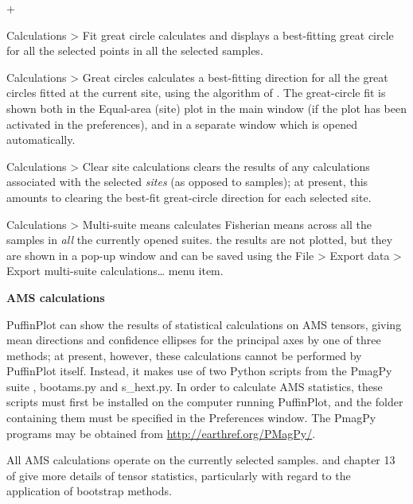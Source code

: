 \documentclass[a4paper,british]{article}
\newcommand{\menuitemlabel}[1]{%
\mbox{\textsf{#1}}\hfil}
\newenvironment{menuitemlist}%
{\begin{list}{}{%
\renewcommand{\makelabel}{\menuitemlabel}%
\setlength{\labelwidth}{35pt}%
\setlength{\leftmargin}%
             {\labelwidth+\labelsep}}}%
{\end{list}}
\newcommand{\ppcmd}[1]{\textsf{#1}} %
\newcommand{\caps}[1]{\MakeTextUppercase{#1}} %
\newcommand{\submenu}{ \textgreater{} } %
\newcommand{\mypara}[1]{\noindent\textbf{#1}

\noindent\ignorespaces} %
\begin{document}
\begin{menuitemlist}
\item[Calculations\submenu Fit great circle] calculates and displays a
  best-fitting great circle for all the selected points in all the selected
  samples.

\item[Calculations\submenu Great circles] calculates a best-fitting direction
  for all the great circles fitted at the current site, using the algorithm
  of \cite{mcfadden1988circles}. The great-circle fit is shown both in the
  \ppcmd{Equal-area (site)} plot in the main window (if the plot has been
  activated in the preferences), and in a separate window which is opened
  automatically.

\item[Calculations\submenu Clear site calculations] clears the results of any
  calculations associated with the selected {\em sites} (as opposed to
  samples); at present, this amounts to clearing the best-fit great-circle
  direction for each selected site.

\item[Calculations\submenu Multi-suite means] calculates Fisherian means
  across all the samples in \emph{all} the currently opened suites. the
  results are not plotted, but they are shown in a pop-up window and can be
  saved using the \ppcmd{File\submenu Export data\submenu Export multi-suite
    calculations\ldots} menu item.

\end{menuitemlist}

\mypara{\caps{Ams} calculations} PuffinPlot can show the results of
statistical calculations on \caps{ams} tensors, giving mean directions
and confidence ellipses for the principal axes by one of three methods;
at present, however, these calculations cannot be performed by
PuffinPlot itself. Instead, it makes use of two Python scripts from the
PmagPy suite \citep{tauxe2010paleomagnetism}, \ppcmd{bootams.py} and
\ppcmd{s\_hext.py}. In order to calculate \caps{ams} statistics, these
scripts must first be installed on the computer running PuffinPlot, and
the folder containing them must be specified in the \ppcmd{Preferences}
window. The PmagPy programs may be obtained from
\url{http://earthref.org/PMagPy/}.

All \caps{ams} calculations operate on the currently selected samples.
\cite{tauxe1998directions} and chapter 13 of \cite{tauxe2010paleomagnetism}
give more details of tensor statistics, particularly with regard to the
application of bootstrap methods.
\end{document}
